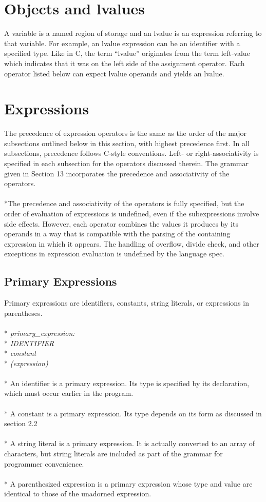 \section{Objects and lvalues}
A variable is a named region of storage and an lvalue is an expression referring to that variable. For example, an lvalue expression can be an identifier with a specified type. Like in C, the term ``lvalue'' originates from the term left-value which indicates that it was on the left side of the assignment operator. Each operator listed below can expect lvalue operands and yields an lvalue.

\section{Expressions}
The precedence of expression operators is the same as the order of the major subsections outlined below in this section, with highest precedence first. In all subsections, precedence follows C-style conventions.  Left- or right-associativity is specified in each subsection for the operators discussed therein. The grammar given in Section 13 incorporates the precedence and associativity of the operators.
\\ \\*The precedence and associativity of the operators is fully specified, but the order of evaluation of expressions is undefined, even if the subexpressions involve side effects. However, each operator combines the values it produces by its operands in a way that is compatible with the parsing of the containing expression in which it appears. The handling of overflow, divide check, and other exceptions in expression evaluation is undefined by the language spec.
\subsection{Primary Expressions}
Primary expressions are identifiers, constants, string literals, or expressions in parentheses.
\\ \\* \tab \emph{primary\_expression:}
\\* \tab \tab \emph{IDENTIFIER}
\\* \tab \tab \emph{constant}
\\* \tab \tab \emph{(expression)}
\\ \\* An identifier is a primary expression. Its type is specified by its declaration, which must occur earlier in the program.
\\ \\* A constant is a primary expression. Its type depends on its form as discussed in section 2.2
\\ \\* A string literal is a primary expression. It is actually converted to an array of characters, but string literals are included as part of the grammar for programmer convenience.    
\\ \\* A parenthesized expression is a primary expression whose type and value are identical to those of the unadorned expression. 

